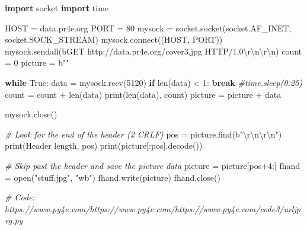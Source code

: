 \documentclass[10pt,]{book}
\newenvironment{Shaded}{}{}
\newcommand{\BuiltInTok}[1]{\textcolor[rgb]{0.00,0.50,0.00}{#1}}
\newcommand{\CharTok}[1]{\textcolor[rgb]{0.25,0.44,0.63}{#1}}
\newcommand{\CommentTok}[1]{\textcolor[rgb]{0.38,0.63,0.69}{\textit{#1}}}
\newcommand{\ControlFlowTok}[1]{\textcolor[rgb]{0.00,0.44,0.13}{\textbf{#1}}}
\newcommand{\DecValTok}[1]{\textcolor[rgb]{0.25,0.63,0.44}{#1}}
\newcommand{\ExtensionTok}[1]{#1}
\newcommand{\ImportTok}[1]{\textcolor[rgb]{0.00,0.50,0.00}{\textbf{#1}}}
\newcommand{\NormalTok}[1]{#1}
\newcommand{\OperatorTok}[1]{\textcolor[rgb]{0.40,0.40,0.40}{#1}}
\newcommand{\StringTok}[1]{\textcolor[rgb]{0.25,0.44,0.63}{#1}}
\newcommand{\VariableTok}[1]{\textcolor[rgb]{0.10,0.09,0.49}{#1}}
\begin{document}
\begin{Shaded}
\begin{Highlighting}[]
\ImportTok{import}\NormalTok{ socket}
\ImportTok{import}\NormalTok{ time}

\NormalTok{HOST }\OperatorTok{=} \StringTok{\textquotesingle{}data.pr4e.org\textquotesingle{}}
\NormalTok{PORT }\OperatorTok{=} \DecValTok{80}
\NormalTok{mysock }\OperatorTok{=}\NormalTok{ socket.socket(socket.AF\_INET, socket.SOCK\_STREAM)}
\NormalTok{mysock.}\ExtensionTok{connect}\NormalTok{((HOST, PORT))}
\NormalTok{mysock.sendall(}\StringTok{b\textquotesingle{}GET http://data.pr4e.org/cover3.jpg HTTP/1.0}\CharTok{\textbackslash{}r\textbackslash{}n\textbackslash{}r\textbackslash{}n}\StringTok{\textquotesingle{}}\NormalTok{)}
\NormalTok{count }\OperatorTok{=} \DecValTok{0}
\NormalTok{picture }\OperatorTok{=} \StringTok{b""}

\ControlFlowTok{while} \VariableTok{True}\NormalTok{:}
\NormalTok{    data }\OperatorTok{=}\NormalTok{ mysock.recv(}\DecValTok{5120}\NormalTok{)}
    \ControlFlowTok{if} \BuiltInTok{len}\NormalTok{(data) }\OperatorTok{\textless{}} \DecValTok{1}\NormalTok{: }\ControlFlowTok{break}
    \CommentTok{\#time.sleep(0.25)}
\NormalTok{    count }\OperatorTok{=}\NormalTok{ count }\OperatorTok{+} \BuiltInTok{len}\NormalTok{(data)}
    \BuiltInTok{print}\NormalTok{(}\BuiltInTok{len}\NormalTok{(data), count)}
\NormalTok{    picture }\OperatorTok{=}\NormalTok{ picture }\OperatorTok{+}\NormalTok{ data}

\NormalTok{mysock.close()}

\CommentTok{\# Look for the end of the header (2 CRLF)}
\NormalTok{pos }\OperatorTok{=}\NormalTok{ picture.find(}\StringTok{b"}\CharTok{\textbackslash{}r\textbackslash{}n\textbackslash{}r\textbackslash{}n}\StringTok{"}\NormalTok{)}
\BuiltInTok{print}\NormalTok{(}\StringTok{\textquotesingle{}Header length\textquotesingle{}}\NormalTok{, pos)}
\BuiltInTok{print}\NormalTok{(picture[:pos].decode())}

\CommentTok{\# Skip past the header and save the picture data}
\NormalTok{picture }\OperatorTok{=}\NormalTok{ picture[pos}\OperatorTok{+}\DecValTok{4}\NormalTok{:]}
\NormalTok{fhand }\OperatorTok{=} \BuiltInTok{open}\NormalTok{(}\StringTok{"stuff.jpg"}\NormalTok{, }\StringTok{"wb"}\NormalTok{)}
\NormalTok{fhand.write(picture)}
\NormalTok{fhand.close()}

\CommentTok{\# Code: https://www.py4e.com/https://www.py4e.com/https://www.py4e.com/code3/urljpeg.py}
\end{Highlighting}
\end{Shaded}
\end{document}

